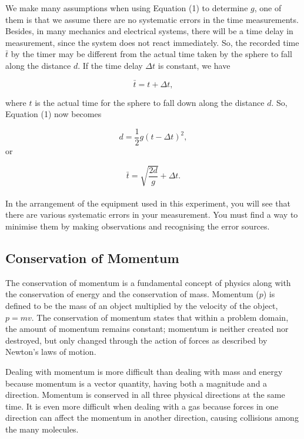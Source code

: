 \documentclass[a4paper,11pt]{article}
\begin{document}
We make many assumptions when using Equation (1) to determine \( g \), one of them is that we assume there are no systematic errors in the time measurements. Besides, in many mechanics and electrical systems, there will be a time delay in measurement, since the system does not react immediately. So, the recorded time \( \bar{t} \) by the timer may be different from the actual time taken by the sphere to fall along the distance \( d \). If the time delay \( \Delta t \) is constant, we have

\begin{equation}
\bar{t} = t + \Delta t,
\end{equation}

where \( t \) is the actual time for the sphere to fall down along the distance \( d \). So, Equation (1) now becomes

\begin{equation}
d = \frac{1}{2} g (t - \Delta t)^2,
\end{equation}
or

\begin{equation}
\bar{t} = \sqrt{\frac{2d}{g}} + \Delta t.
\end{equation}
\\

In the arrangement of the equipment used in this experiment, you will see that there are 
various systematic errors in your measurement. You must find a way to minimise them by 
making observations and recognising the error sources.
\subsection*{Conservation of Momentum}
The conservation of momentum is a fundamental concept of physics along with the conservation of energy and the conservation of mass. Momentum ($p$) is defined to be the mass of an object multiplied by the velocity of the object, $p = mv$. The conservation of momentum states that within a problem domain, the amount of momentum remains constant; momentum is neither created nor destroyed, but only changed through the action of forces as described by Newton's laws of motion.

Dealing with momentum is more difficult than dealing with mass and energy because momentum is a vector quantity, having both a magnitude and a direction. Momentum is conserved in all three physical directions at the same time. It is even more difficult when dealing with a gas because forces in one direction can affect the momentum in another direction, causing collisions among the many molecules.
\end{document}
